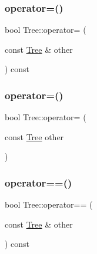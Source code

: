 \mbox{\label{class_tree_a9d2ba086c896bd54a3d789da5d0ae7dc}} 
\subsubsection{\texorpdfstring{operator=()}{operator=()}\hspace{0.1cm}{\footnotesize\ttfamily [1/2]}}
{\footnotesize\ttfamily bool Tree\+::operator= (\begin{DoxyParamCaption}\item[{const \mbox{\hyperlink{class_tree}{Tree}} \&}]{other }\end{DoxyParamCaption}) const}

\mbox{\label{class_tree_af56ab40d0b2a675c75e3ad10de48ada2}} 
\subsubsection{\texorpdfstring{operator=()}{operator=()}\hspace{0.1cm}{\footnotesize\ttfamily [2/2]}}
{\footnotesize\ttfamily bool Tree\+::operator= (\begin{DoxyParamCaption}\item[{const \mbox{\hyperlink{class_tree}{Tree}}}]{other }\end{DoxyParamCaption})}

\mbox{\label{class_tree_a9672b806456d9c1fc6a9ffa0a0803071}} 
\subsubsection{\texorpdfstring{operator==()}{operator==()}}
{\footnotesize\ttfamily bool Tree\+::operator== (\begin{DoxyParamCaption}\item[{const \mbox{\hyperlink{class_tree}{Tree}} \&}]{other }\end{DoxyParamCaption}) const}

\mbox{\label{class_tree_a4073a7cc0b9b3388db7bff4491e96e72}} 
